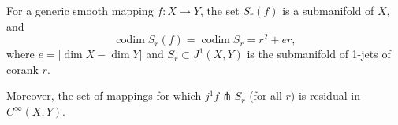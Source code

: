 For a generic smooth mapping $f: X \to Y$, the set $S_r(f)$ is a submanifold of $X$, and
$$
\operatorname{codim} S_r(f) = \operatorname{codim} S_r = r^2 + er,
$$
where $e = |\dim X - \dim Y|$ and $S_r \subset J^1(X,Y)$ is the submanifold of 1-jets of corank $r$.

Moreover, the set of mappings for which $j^1 f \pitchfork S_r$ (for all $r$) is residual in $C^\infty(X,Y)$.
